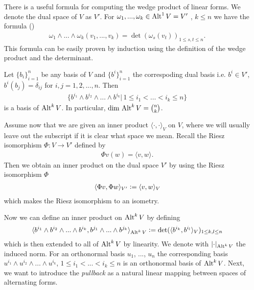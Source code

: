 \documentclass[../master_thesis.tex]{subfiles}
\begin{document}
There is a useful formula for computing the wedge product of linear forms.
We denote the dual space of $V$ as $V'$.
For  $\omega_1,...,\omega_k \in {\text{Alt}^{1}\,V} = V'$
, $k \leq n$ we have the formula (\cite[p.260]{topology_and_geometry})
\begin{align}
    \omega_1 \wedge ... \wedge \omega_k (v_1,...,v_k)
    = \det (\omega_s(v_t))_{1\leq s,t \leq n}. 
    \label{eq:wedge_product_of_one_forms}
\end{align}
This formula can be easily proven by induction using the definition of the 
wedge product and the determinant.

Let $\{ b_i\}_{i=1}^n$ be any basis of $V$ and $\{ b^i\}_{i=1}^n$ the 
correspoding dual basis i.e. 
$b^i \in V'$, $b^i(b_j) = \delta_{ij}$ for $i,j = 1,2,..., n$. Then 
\begin{align*}
    \{b^{i_1} \wedge b^{i_2} \wedge ... \wedge b^{i_k} | \, 
    1 \leq i_1 < ... < i_k \leq n \}
\end{align*}
is a basis of ${\text{Alt}^{k}\,V}$. In particular, 
$\dim\, {\text{Alt}^{k}\,V} = \binom{n}{k}$.

Assume now that we are given an inner product $\langle \cdot, \cdot \rangle_V$ on $V$, 
where we will usually leave out the 
subscript if it is clear what space we mean.
Recall the Riesz isomorphism $\Phi: V \rightarrow V'$ defined by
\begin{align*}
    \Phi v (w) = \langle v, w \rangle.
\end{align*}
Then we obtain an inner 
product on the dual space $V'$ by using the Riesz isomorphism $\Phi$ 
\begin{align*}
    \langle \Phi v, \Phi w \rangle_{V'} \vcentcolon= \langle v, w \rangle_V
\end{align*}
which makes the Riesz isomorphism to an isometry.

Now we can define an inner product on ${\text{Alt}^{k}\,V}$ by defining
\begin{align}
    \langle b^{i_1} \wedge b^{i_2} \wedge... \wedge b^{i_k}, 
    b^{j_1} \wedge... \wedge b^{j_k} \rangle_{{\text{Alt}^{k}\,V}} 
    \vcentcolon= \det  ( \langle b^{i_k}, b^{i_l} \rangle_V )_
    {1\leq k,l \leq n} \label{eq:inner_product_alternating_forms}
\end{align}
which is then extended to all of ${\text{Alt}^{k}\,V}$ by linearity. 
We denote with $\lvert \cdot \rvert _{\text{Alt}^{k}\,V}$ the induced norm.
For an orthonormal basis 
$u_1$, ..., $u_n$ the corresponding basis 
$u^{i_1} \wedge u^{i_2} \wedge ... \wedge u^{i_k}$, 
$1\leq i_1 < ... < i_k \leq n$ is an orthonormal basis of ${\text{Alt}^{k}\,V}$.
Next, we want to introduce the \textit{pullback} as a natural linear
mapping between spaces of alternating forms. 
\end{document}
